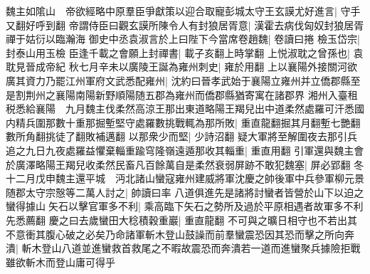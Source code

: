 魏主如隂山　帝欲經略中原羣臣爭獻策以迎合取寵彭城太守王玄謨尤好進言|{
	守手又翻好呼到翻}
帝謂侍臣曰觀玄謨所陳令人有封狼居胥意|{
	漢霍去病伐匈奴封狼居胥禪于姑衍以臨瀚海}
御史中丞袁淑言於上曰陛下今當席卷趙魏|{
	卷讀曰捲}
檢玉岱宗|{
	封泰山用玉檢}
臣逢千載之會願上封禪書|{
	載子亥翻上時掌翻}
上悦淑耽之曾孫也|{
	袁耽見晉成帝紀}
秋七月辛未以廣陵王誕為雍州刺史|{
	雍於用翻}
上以襄陽外接關河欲廣其資力乃罷江州軍府文武悉配雍州|{
	沈約曰晉孝武始于襄陽立雍州并立僑郡縣至是割荆州之襄陽南陽新野順陽随五郡為雍州而僑郡縣猶寄寓在諸郡界}
湘州入臺租税悉給襄陽　九月魏主伐柔然高涼王那出東道略陽王羯兒出中道柔然處羅可汗悉國内精兵圍那數十重那掘塹堅守處羅數挑戰輒為那所敗|{
	重直龍翻掘其月翻塹七艷翻數所角翻挑徒了翻敗補邁翻}
以那衆少而堅|{
	少詩沼翻}
疑大軍將至解圍夜去那引兵追之九日九夜處羅益懼棄輜重踰穹隆嶺遠遁那收其輜重|{
	重直用翻}
引軍還與魏主會於廣澤略陽王羯兒收柔然民畜凡百餘萬自是柔然衰弱屏跡不敢犯魏塞|{
	屏必郢翻}
冬十二月戊申魏主還平城　沔北諸山蠻寇雍州建威將軍沈慶之帥後軍中兵參軍柳元景随郡太守宗慤等二萬人討之|{
	帥讀曰率}
八道俱進先是諸將討蠻者皆營於山下以迫之蠻得據山矢石以擊官軍多不利|{
	乘高臨下矢石之勢所及過於平原相遇者故軍多不利先悉薦翻}
慶之曰去歲蠻田大稔積穀重巖|{
	重直龍翻}
不可與之曠日相守也不若出其不意衝其腹心破之必矣乃命諸軍斬木登山鼓譟而前羣蠻震恐因其恐而擊之所向奔潰|{
	斬木登山八道並進蠻救首救尾之不暇故震恐而奔潰若一道而進蠻聚兵據險拒戰雖欲斬木而登山庸可得乎}


